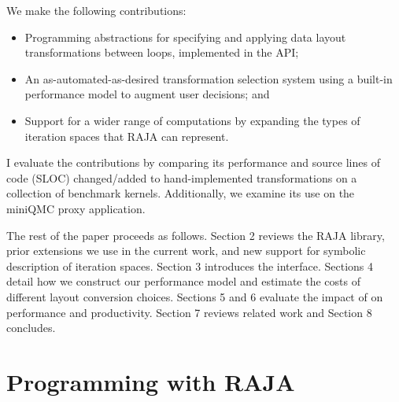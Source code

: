 We make the following contributions:
\begin{itemize}
\item Programming abstractions for specifying and applying data layout transformations between loops, implemented in the \FormatDecisions{} API;
\item An as-automated-as-desired transformation selection system using a built-in performance model to augment user decisions; and
\item Support for a wider range of computations by expanding the types of iteration spaces that RAJA can represent.
\end{itemize}
I evaluate the contributions by comparing its performance and source lines of code (SLOC) changed/added to hand-implemented transformations on a collection of benchmark kernels.
Additionally, we examine its use on the miniQMC proxy application.

The rest of the paper proceeds as follows. 
Section 2 reviews the RAJA library, prior extensions we use in the current work, and new support for symbolic description of iteration spaces.
Section 3 introduces the \FormatDecisions{} interface.
Sections 4 detail how we construct our performance model and estimate the costs of different layout conversion choices.
Sections 5 and 6 evaluate the impact of \FormatDecisions{}  on performance and productivity.
Section 7 reviews related work and Section 8 concludes.



\section{Programming with RAJA}

